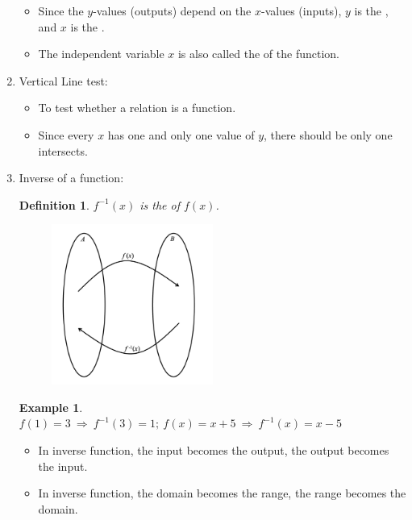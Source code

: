 \documentclass[12pt, a4paper]{article}
\newtheorem{definition}{Definition}[subsection]
\newtheorem{example}{Example}[subsection]
\begin{document}
\begin{enumerate}
\begin{itemize}
\begin{enumerate}
        \end{enumerate}
        \item Since the $y$-values (outputs) depend on the $x$-values (inputs), $y$ is the \textbf{\color{red}{dependent variable}}, and $x$ is the \textbf{\color{red}{independent variable}}.
        \item The independent variable $x$ is also called the \textbf{\color{red}{argument}} of the function. 
    \end{itemize}
    \item Vertical Line test: 
    \begin{itemize}
        \item To test whether a relation is a function. 
        \item Since every $x$ has one and only one value of $y$, there should be only one intersects. 
    \end{itemize}
    \item Inverse of a function: 
    \begin{definition}
        $f^{-1}(x)$ is the \textbf{\color{red}{inverse function}} of $f(x)$.
        \begin{figure}[H]
            \centering
            \includegraphics[width=0.5\textwidth]{Fig.2.1.jpg}
          \end{figure}
    \end{definition}
    \begin{example}
        $f(1)=3\ \Rightarrow\ f^{-1}(3)=1;\ f(x)=x+5\ \Rightarrow\ f^{-1}(x)=x-5$
    \end{example}
    \begin{itemize}
        \item In inverse function, the input becomes the output, the output becomes the input. 
        \item In inverse function, the domain becomes the range, the range becomes the domain. 

\end{itemize}
\end{enumerate}
\end{document}
